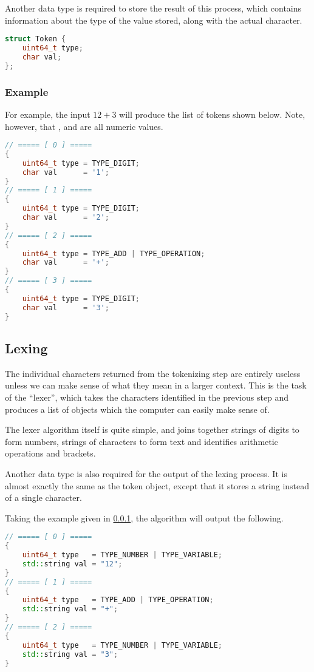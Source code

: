 \documentclass[12pt]{article}
\begin{document}
Another data type is required to store the result of this process, which contains information about the type of the value stored, along with the actual character.

\begin{lstlisting}[language=C++, caption={The token object definition}]
struct Token {
	uint64_t type;
	char val;
};
\end{lstlisting}

\subsubsection{Example} \label{tokenexample}

For example, the input $12 + 3$ will produce the list of tokens shown below. Note, however, that ,  and  are all numeric values.

\begin{lstlisting}[language=C++]
// ===== [ 0 ] =====
{
	uint64_t type = TYPE_DIGIT;
	char val      = '1';
}
// ===== [ 1 ] =====
{
	uint64_t type = TYPE_DIGIT;
	char val      = '2';
}
// ===== [ 2 ] =====
{
	uint64_t type = TYPE_ADD | TYPE_OPERATION;
	char val      = '+';
}
// ===== [ 3 ] =====
{
	uint64_t type = TYPE_DIGIT;
	char val      = '3';
}
\end{lstlisting}

\subsection{Lexing}

The individual characters returned from the tokenizing step are entirely useless unless we can make sense of what they mean in a larger context. This is the task of the ``lexer'', which takes the characters identified in the previous step and produces a list of objects which the computer can easily make sense of.

The lexer algorithm itself is quite simple, and joins together strings of digits to form numbers, strings of characters to form text and identifies arithmetic operations and brackets.

Another data type is also required for the output of the lexing process. It is almost exactly the same as the token object, except that it stores a string instead of a single character.

Taking the example given in \ref{tokenexample}, the algorithm will output the following.

\begin{lstlisting}[language=C++]
// ===== [ 0 ] =====
{
	uint64_t type   = TYPE_NUMBER | TYPE_VARIABLE;
	std::string val = "12";
}
// ===== [ 1 ] =====
{
	uint64_t type   = TYPE_ADD | TYPE_OPERATION;
	std::string val = "+";
}
// ===== [ 2 ] =====
{
	uint64_t type   = TYPE_NUMBER | TYPE_VARIABLE;
	std::string val = "3";
}
\end{lstlisting}
\end{document}
